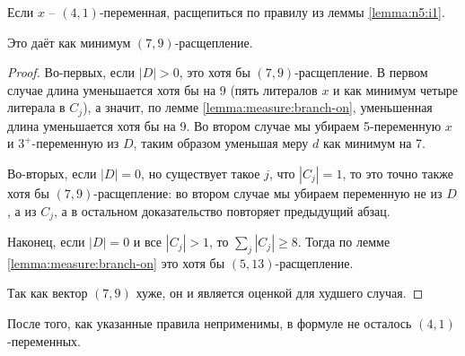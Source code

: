 \begin{brule}
 Если $x$ -- $(4,1)$-переменная, расщепиться по правилу из леммы \ref{lemma:n5:i1}.

 Это даёт как минимум $(7,9)$-расщепление.
 \label{brule:n5:41}
\end{brule}

\begin{proof}
 Во-первых, если $|D| > 0$, это хотя бы $(7,9)$-расщепление. В первом случае длина уменьшается хотя бы на 9 (пять литералов $x$ и как минимум четыре литерала в $C_j$), а значит, по лемме \ref{lemma:measure:branch-on}, уменьшенная длина уменьшается хотя бы на 9. Во втором случае мы убираем 5-переменную $x$ и $3^+$-переменную из $D$, таким образом уменьшая меру $d$ как минимум на 7.

 Во-вторых, если $|D| = 0$, но существует такое $j$, что $|C_j| = 1$, то это точно также хотя бы $(7,9)$-расщепление: во втором случае мы убираем переменную не из $D$, а из $C_j$, а в остальном доказательство повторяет предыдущий абзац.

 Наконец, если $|D| = 0$ и все $|C_j| > 1$, то $\sum_j |C_j| \geq 8$. Тогда по лемме \ref{lemma:measure:branch-on} это хотя бы $(5,13)$-расщепление.

 Так как вектор $(7,9)$ хуже, он и является оценкой для худшего случая.
\end{proof}

После того, как указанные правила неприменимы, в формуле не осталось $(4,1)$-переменных.


